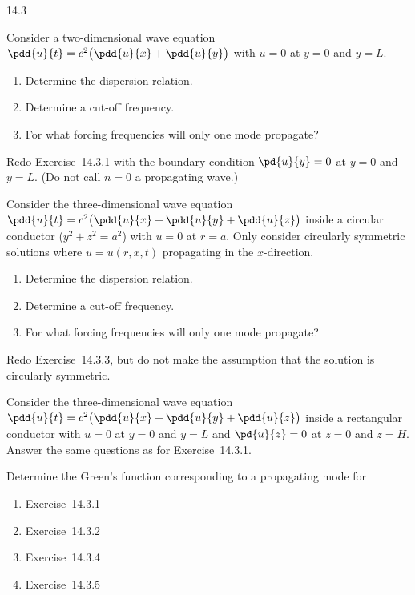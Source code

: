 \begin{exercises}{14.3}
\item Consider a two-dimensional wave equation $\pdd{u}{t} = c^2\bigl(\pdd{u}{x} + \pdd{u}{y}\bigr)$ with $u = 0$ at $y = 0$ and $y = L$.
\begin{enumerate}
\item[(a)] Determine the dispersion relation.
\item[(b)] Determine a cut-off frequency.
\item[(c)] For what forcing frequencies will only one mode propagate?
\end{enumerate}

\item Redo Exercise~14.3.1 with the boundary condition $\pd{u}{y} = 0$ at $y = 0$ and $y = L$.  (Do not call $n = 0$ a propagating wave.)

\item Consider the three-dimensional wave equation $\pdd{u}{t} = c^2\bigl(\pdd{u}{x} + \pdd{u}{y} + \pdd{u}{z}\bigr)$ inside a circular conductor ($y^2 + z^2 = a^2$) with $u = 0$ at $r = a$.  Only consider circularly symmetric solutions where $u = u(r,x,t)$ propagating in the $x$-direction.
\begin{enumerate}
\item[(a)] Determine the dispersion relation.
\item[(b)] Determine a cut-off frequency.
\item[(c)] For what forcing frequencies will only one mode propagate?
\end{enumerate}

\item Redo Exercise~14.3.3, but do not make the assumption that the solution is circularly symmetric.

\item Consider the three-dimensional wave equation $\pdd{u}{t} = c^2\bigl(\pdd{u}{x} + \pdd{u}{y} + \pdd{u}{z}\bigr)$ inside a rectangular conductor with $u = 0$ at $y = 0$ and $y = L$ and $\pd{u}{z} = 0$ at $z = 0$ and $z = H$.  Answer the same questions as for Exercise~14.3.1.

\item Determine the Green's function corresponding to a propagating mode for
\begin{enumerate}
\item[(a)] Exercise~14.3.1
\item[(b)] Exercise~14.3.2
\item[(c)] Exercise~14.3.4
\item[(d)] Exercise~14.3.5
\end{enumerate}


\end{exercises}
